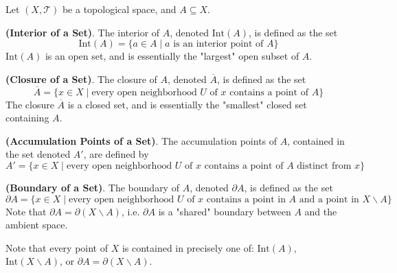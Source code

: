 \begin{framed}
    Let $(X,\mathcal{T})$ be a topological space, and $A\subseteq X$.
    \begin{defn}
        \textbf{(Interior of a Set)}. The interior of $A$, denoted $\text{Int}(A)$, is defined as the set \[\text{Int}(A) = \{a\in A\mid a\text{ is an interior point of }A\}\] $\text{Int}(A)$ is an open set, and is essentially the "largest" open subset of $A$.
    \end{defn}

    \begin{defn}
        \textbf{(Closure of a Set)}. The closure of $A$, denoted $\overline{A}$, is defined as the set \[\overline{A} = \{x\in X\mid \text{every open neighborhood }U\text{ of }x\text{ contains a point of }A\}\] The closure $\overline{A}$ is a closed set, and is essentially the "smallest" closed set containing $A$.
    \end{defn}

    \begin{defn}
        \textbf{(Accumulation Points of a Set)}. The accumulation points of $A$, contained in the set denoted $A'$, are defined by \[A' = \{x\in X \mid \text{every open neighborhood }U\text{ of }x\text{ contains a point of } A\text{ distinct from }x\}\] 
    \end{defn}

    \begin{defn}
        \textbf{(Boundary of a Set)}. The boundary of $A$, denoted $\partial A$, is defined as the set \[\partial A = \{x\in X\mid \text{every open neighborhood }U\text{ of }x\text{ contains a point in }A\text{ and a point in }X\backslash A\}\] Note that $\partial A = \partial (X\backslash A)$, i.e. $\partial A$ is a "shared" boundary between $A$ and the ambient space.
    \end{defn}

    Note that every point of $X$ is contained in precisely one of: $\text{Int}(A)$, $\text{Int}(X\backslash A)$, or $\partial A = \partial (X\backslash A)$.
\end{framed}

